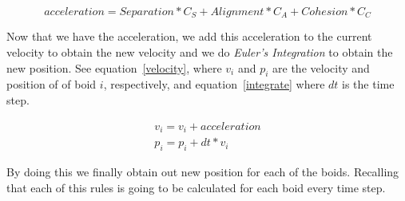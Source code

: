 \begin{equation}
\label{combine}
acceleration = Separation * C_S + Alignment * C_A + Cohesion * C_C
\end{equation}

Now that we have the acceleration, we add this acceleration to the current velocity to obtain the new velocity and we do \textit{Euler's Integration} to obtain the new position. See equation~\ref{velocity}, where $v_i$ and $p_i$ are the velocity and position of of boid $i$, respectively, and equation~\ref{integrate} where $dt$ is the time step. 

\begin{align}
\label{velocity}
v_i = v_i + acceleration\\
\label{integrate}
p_i = p_i + dt * v_i
\end{align}

By doing this we finally obtain out new position for each of the boids. Recalling that each of this rules is going to be calculated for each boid every time step.

